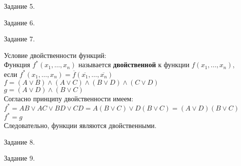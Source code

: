 \documentclass[a4paper,12pt]{report} %
\begin{document}
\bigskip

\begin{center}
Задание 5.\\
\end{center}

\begin{flushleft}

\end{flushleft}

\bigskip

\begin{center}
Задание 6.\\
\end{center}

\begin{flushleft}

\end{flushleft}

\bigskip

\begin{center}
Задание 7.\\
\end{center}

\begin{flushleft}
Условие двойственности функций:\\
Функция $f^{*}(x_1, \ldots , x_n)$ называется \textbf{двойственной} к функции $f(x_1, \ldots , x_n)$,\\
если $f^{*}(x_1, \ldots , x_n) = \overline{f}(\overline{x_1}, \ldots , \overline{x_n})$\\
\bigskip
$f=(A \vee B) \wedge (A \vee C) \wedge (B \vee D) \wedge (C \vee D)$\\
$g= (A \vee D) \wedge (B \vee C)$\\
Согласно принципу двойственности имеем:\\
$f^{*}= AB \vee AC \vee BD \vee CD = A(B \vee C) \vee D(B \vee C) = (A\vee D)(B \vee C)$\\
$f^{*} = g$\\
Следовательно, функции являются двойственными.
\end{flushleft}

\bigskip

\begin{center}
Задание 8.\\
\end{center}

\begin{flushleft}

\end{flushleft}

\bigskip

\begin{center}
Задание 9.\\
\end{center}

\begin{flushleft}

\end{flushleft}
\end{document}
